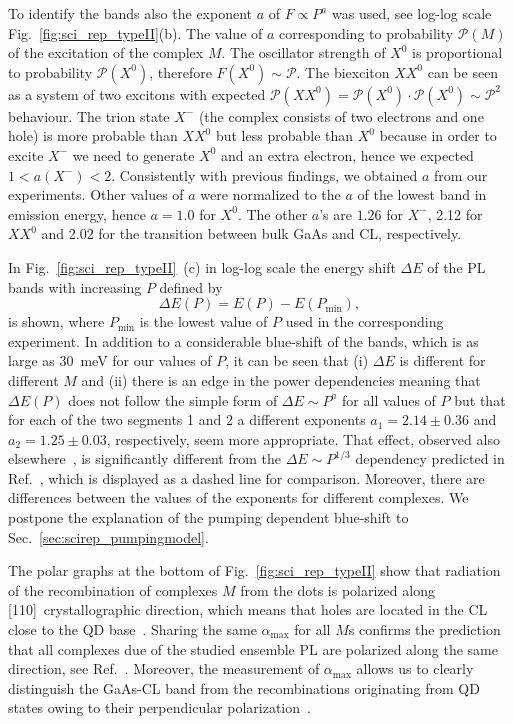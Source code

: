To identify the bands also the exponent $a$ of $F\propto P^a$ was used, see log-log scale Fig.~\ref{fig:sci_rep_typeII}(b). The value of $a$ corresponding to probability $\mathcal{P}(M)$ of the excitation of the complex $M$. The oscillator strength of $X^0$ is proportional to probability $\mathcal{P}(X^0)$, therefore $F(X^0)\sim \mathcal{P}$. The biexciton $XX^0$ can be seen as a system of two excitons with expected $\mathcal{P}(XX^0)=\mathcal{P}(X^0)\cdot \mathcal{P}(X^0)\sim \mathcal{P}^2$ behaviour. The trion state $X^-$ (the complex consists of two electrons and one hole) is more probable than $XX^0$ but less probable than $X^0$ because in order to excite $X^-$ we need to generate $X^0$ and an extra electron, hence we expected $1<a(X^-)<2$. Consistently with previous findings, we obtained $a$ from our experiments. Other values of $a$ were normalized to the $a$ of the lowest band in emission energy, hence $a=1.0$ for $X^0$. The other $a$'s are $1.26$ for $X^-$, 2.12 for $XX^0$ and 2.02 for the transition between bulk GaAs and CL, respectively.


In Fig.~\ref{fig:sci_rep_typeII}~(c) in log-log scale the energy shift $\Delta E$ of the PL bands with increasing $P$ defined by
\begin{equation}
\Delta E(P)= E(P) - E(P_\mathrm{min}),
\end{equation}
is shown, where $P_\mathrm{min}$ is the lowest value of $P$ used in the corresponding experiment. In addition to a considerable blue-shift of the bands, which is as large as 30~meV for our values of $P$, it can be seen that (i) $\Delta E$ is different for different $M$ and (ii) there is an edge in the power dependencies meaning that $\Delta E(P)$ 
does not follow the simple form of $\Delta E\sim P^a$ for all values of $P$ but that for each of the two segments 1 and 2 a different exponents $a_1=2.14\pm0.36$ and $a_2=1.25\pm0.03$, respectively, seem more appropriate. That effect, observed also elsewhere~\citep{Muller-Kirsch2001}, is significantly different from the $\Delta E\sim P^{1/3}$ dependency predicted in Ref.~\citep{Hatami1998}, which is displayed as a dashed line for comparison.
Moreover, there are differences between the values of the exponents for different complexes. We postpone the explanation of the pumping dependent blue-shift to Sec.~\ref{sec:scirep_pumpingmodel}.

The polar graphs at the bottom of Fig.~\ref{fig:sci_rep_typeII} show that radiation of the recombination of complexes $M$ from the dots is polarized along [110]~crystallographic direction, which means that holes are located in the CL close to the QD base~\citep{Klenovsky2015}. Sharing the same $\alpha_\mathrm{max}$ for all $M$s confirms the prediction that all complexes due of the studied ensemble PL are polarized along the same direction, see Ref.~\citep{Klenovsky2017}. Moreover, the measurement of $\alpha_\mathrm{max}$ allows us to clearly distinguish the GaAs-CL band from the recombinations originating from QD states owing to their perpendicular polarization~\citep{Alonso-Alvarez2011a}.

